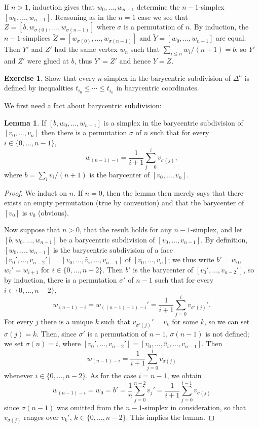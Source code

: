 \documentclass[10pt]{article}
\theoremstyle{definition}
\newtheorem{exer}{Exercise}
\newtheorem{lemma}{Lemma}[exer]
\begin{document}
If $n > 1$, induction gives that $w_0, \dots, w_{n-1}$ determine the $n-1$-simplex $[w_0, \dots, w_{n-1}]$.
Reasoning as in the $n = 1$ case we see that $Z = [b, w_{\sigma(0)}, \dots, w_{\sigma(n-1)}]$ where $\sigma$ is a permutation of $n$.
By induction, the $n-1$-simplices $\tilde Z = [w_{\sigma(0)}, \dots, w_{\sigma(n-1)}]$ and $\tilde Y = [w_0, \dots, w_{n-1}]$ are equal.
Then $Y'$ and $Z'$ had the same vertex $w_n$ such that $\sum_{i \leq n} w_i/(n+1) = b$, so $Y'$ and $Z'$ were glued at $b$, thus $Y' = Z'$ and hence $Y = Z$.

\begin{exer}
Show that every $n$-simplex in the barycentric subdivision of $\Delta^n$ is defined by inequalities $t_{i_0} \leq \cdots \leq t_{i_n}$ in barycentric coordinates.
\end{exer}

We first need a fact about barycentric subdivision:
\begin{lemma}
If $[b, w_0, \dots, w_{n-1}]$ is a simplex in the barycentric subdivision of $[v_0, \dots, v_n]$ then there is a permutation $\sigma$ of $n$ such that for every $i \in \{0, \dots, n-1\}$,
$$w_{(n-1)-i} = \frac{1}{i+1} \sum_{j=0}^i v_{\sigma(j)},$$
where $b = \sum_i v_i/(n+1)$ is the barycenter of $[v_0, \dots, v_n]$.
\end{lemma}
\begin{proof}
We induct on $n$.
If $n = 0$, then the lemma then merely says that there exists an empty permutation (true by convention) and that the barycenter of $[v_0]$ is $v_0$ (obvious).

Now suppose that $n > 0$, that the result holds for any $n-1$-simplex, and let $[b, w_0, \dots, w_{n-1}]$ be a barycentric subdivision of $[v_0, \dots, v_{n-1}]$.
By definition, $[w_0, \dots, w_{n-1}]$ is the barycentric subdivision of a face $[v_0', \dots, v_{n-2}'] = [v_0, \dots, \widehat v_i, \dots, v_{n-1}]$ of $[v_0, \dots, v_n]$; we thus write $b' = w_0$, $w_i' = w_{i+1}$ for $i \in \{0, \dots, n-2\}$.
Then $b'$ is the barycenter of $[v_0', \dots, v_{n-2}']$, so by induction, there is a permutation $\sigma'$ of $n - 1$ such that for every $i \in \{0, \dots, n - 2\}$,
$$w_{(n-1)-i} = w_{((n-1)-1)-i}' = \frac{1}{i+1} \sum_{j=0}^i v_{\sigma'(j)}'.$$
For every $j$ there is a unique $k$ such that $v_{\sigma'(j)}' = v_k$ for some $k$, so we can set $\sigma(j) = k$.
Then, since $\sigma'$ is a permutation of $n - 1$, $\sigma(n - 1)$ is not defined; we set $\sigma(n) = i$, where $[v_0', \dots, v_{n-2}'] = [v_0, \dots, \widehat v_i, \dots, v_{n-1}]$.
Then
$$w_{(n-1)-i} = \frac{1}{i+1} \sum_{j=0}^i v_{\sigma(j)}$$
whenever $i \in \{0, \dots, n - 2\}$. As for the case $i = n -1$, we obtain
$$w_{(n-1)-i} = w_0 = b' = \frac{1}{n} \sum_{j=0}^{n-2} v_j' = \frac{1}{i+1} \sum_{j=0}^{i-1} v_{\sigma(j)}$$
since $\sigma(n-1)$ was omitted from the $n-1$-simplex in consideration, so that $v_{\sigma(j)}$ ranges over $v_k'$, $k \in \{0, \dots, n - 2\}$.
This implies the lemma.
\end{proof}
\end{document}
